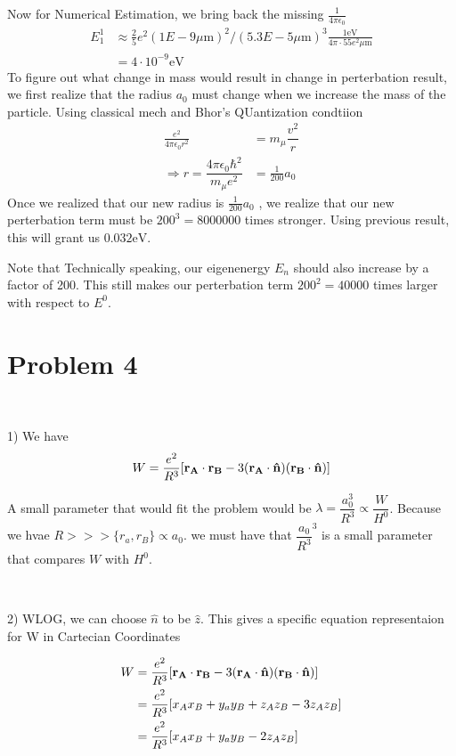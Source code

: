 \documentclass[10pt]{article}
\begin{document}
 Now for Numerical Estimation, we bring back the missing $\frac{1}{4 \pi \epsilon_0}$
\begin{align*}
    E_1^1 &\approx \frac{2}{5}e^2(1E-9 \textrm{$\mu$m})^2/(5.3E-5 \textrm{$\mu$m})^3  \frac{1 \textrm{eV}}{4\pi \cdot 55 e^2 \textrm{$\mu$m} } \\
    &= 4\cdot 10^{-9    } \textrm{eV}
\end{align*}
To figure out what change in mass would result in change in perterbation result, we first realize that the radius $a_0$ must change when we increase the mass of the particle. Using classical mech and Bhor's QUantization condtiion 
\begin{align*}
    \frac{e^2}{4 \pi \epsilon_0 r^2} &= m_\mu \dfrac{v^2}{r} \\
    \Rightarrow r= \dfrac{4\pi \epsilon_0 \hbar^2 }{m_\mu e^2} &= \frac{1}{200} a_0
 \end{align*}
 Once we realized that our new radius is $\frac{1}{200} a_0$ , we realize that our new perterbation term must be $200^3=8000000$ times stronger. Using previous result, this will grant us $0.032 \textrm{eV}$. 


 Note that Technically speaking, our eigenenergy $E_n$ should also increase by a factor of 200. This still makes our perterbation term $200^2 = 40000$ times larger with respect to $E^0$. 

 \section*{Problem 4}
\ 

1) We have 
\begin{equation}
	W = \dfrac{e^2}{R^3}[\vectorbold{r_A}\cdot \vectorbold{r_B}-3(\vectorbold{r_A \cdot \hat{n}})(\vectorbold{r_B \cdot \hat{n}})]
\end{equation}


A small parameter that would fit the problem would be $\lambda = \dfrac{a_0^3}{R^3} \propto \dfrac{W}{H^0}$. Because we hvae $R >>> \{r_a, r_B \} \propto a_0$. we must have that $\dfrac{a_0}{R^3}^3$ is a small parameter that compares $W$ with $H^0$.

\  

2) 
WLOG, we can choose $\hat{n}$ to be $\hat{z}$. This gives a specific equation representaion for W in Cartecian Coordinates

\begin{align*}
	W &= \dfrac{e^2}{R^3}[\vectorbold{r_A}\cdot \vectorbold{r_B}-3(\vectorbold{r_A \cdot \hat{n}})(\vectorbold{r_B \cdot \hat{n}})] \\
	&= \dfrac{e^2}{R^3}[x_A x_B + y_a y_B + z_A z_B - 3z_A z_B] \\
	&= \dfrac{e^2}{R^3}[x_A x_B + y_a y_B  - 2z_A z_B]
\end{align*}
\end{document}
